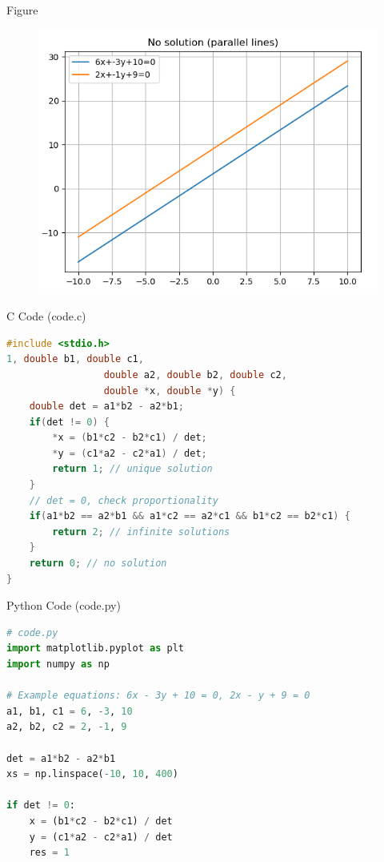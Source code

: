 \documentclass{beamer}
\begin{document}
\begin{frame}{Figure}
\begin{figure}[h!]
    \centering
    \includegraphics[height=0.5\textheight, keepaspectratio]{figs/fig.png}
    \label{figure_1}
\end{figure}
\end{frame}

\begin{frame}[fragile]{C Code (code.c)}
\begin{lstlisting}[language=C]
#include <stdio.h>
1, double b1, double c1,
                 double a2, double b2, double c2,
                 double *x, double *y) {
    double det = a1*b2 - a2*b1;
    if(det != 0) {
        *x = (b1*c2 - b2*c1) / det;
        *y = (c1*a2 - c2*a1) / det;
        return 1; // unique solution
    }
    // det = 0, check proportionality
    if(a1*b2 == a2*b1 && a1*c2 == a2*c1 && b1*c2 == b2*c1) {
        return 2; // infinite solutions
    }
    return 0; // no solution
}

\end{lstlisting}
\end{frame}

\begin{frame}[fragile]{Python Code (code.py)}
\begin{lstlisting}[language=Python]
# code.py
import matplotlib.pyplot as plt
import numpy as np

# Example equations: 6x - 3y + 10 = 0, 2x - y + 9 = 0
a1, b1, c1 = 6, -3, 10
a2, b2, c2 = 2, -1, 9

det = a1*b2 - a2*b1
xs = np.linspace(-10, 10, 400)

if det != 0:
    x = (b1*c2 - b2*c1) / det
    y = (c1*a2 - c2*a1) / det
    res = 1


\end{lstlisting}
\end{frame}
\end{document}
